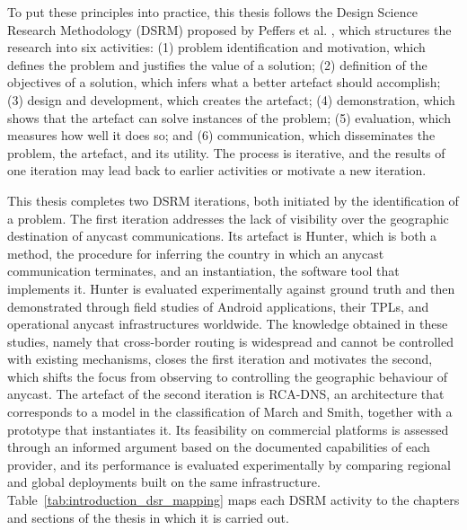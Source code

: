 \documentclass[
A4paper,                %
twoside,                %
openright,              %
chapterprefix=true,     %
12pt,                   %
headings=normal,        %
titlepage=on            %
]{book}
\begin{document}
To put these principles into practice, this thesis follows the Design Science Research Methodology (DSRM) proposed by Peffers et al. \cite{Peffers2007AResearch}, which structures the research into six activities: (1) problem identification and motivation, which defines the problem and justifies the value of a solution; (2) definition of the objectives of a solution, which infers what a better artefact should accomplish; (3) design and development, which creates the artefact; (4) demonstration, which shows that the artefact can solve instances of the problem; (5) evaluation, which measures how well it does so; and (6) communication, which disseminates the problem, the artefact, and its utility. The process is iterative, and the results of one iteration may lead back to earlier activities or motivate a new iteration.

This thesis completes two DSRM iterations, both initiated by the identification of a problem. The first iteration addresses the lack of visibility over the geographic destination of anycast communications. Its artefact is Hunter, which is both a method, the procedure for inferring the country in which an anycast communication terminates, and an instantiation, the software tool that implements it. Hunter is evaluated experimentally against ground truth and then demonstrated through field studies of Android applications, their TPLs, and operational anycast infrastructures worldwide. The knowledge obtained in these studies, namely that cross-border routing is widespread and cannot be controlled with existing mechanisms, closes the first iteration and motivates the second, which shifts the focus from observing to controlling the geographic behaviour of anycast. The artefact of the second iteration is RCA-DNS, an architecture that corresponds to a model in the classification of March and Smith, together with a prototype that instantiates it. Its feasibility on commercial platforms is assessed through an informed argument based on the documented capabilities of each provider, and its performance is evaluated experimentally by comparing regional and global deployments built on the same infrastructure. Table~\ref{tab:introduction_dsr_mapping} maps each DSRM activity to the chapters and sections of the thesis in which it is carried out.
\end{document}

